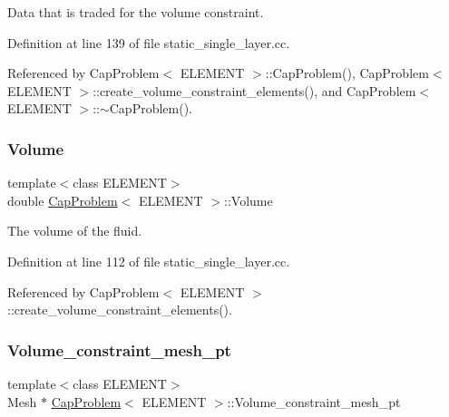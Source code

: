 Data that is traded for the volume constraint. 



Definition at line 139 of file static\+\_\+single\+\_\+layer.\+cc.



Referenced by Cap\+Problem$<$ E\+L\+E\+M\+E\+N\+T $>$\+::\+Cap\+Problem(), Cap\+Problem$<$ E\+L\+E\+M\+E\+N\+T $>$\+::create\+\_\+volume\+\_\+constraint\+\_\+elements(), and Cap\+Problem$<$ E\+L\+E\+M\+E\+N\+T $>$\+::$\sim$\+Cap\+Problem().

\mbox{\label{classCapProblem_ab1f403fd3be7648c3a52a66684a78f7e}} 
\subsubsection{\texorpdfstring{Volume}{Volume}}
{\footnotesize\ttfamily template$<$class E\+L\+E\+M\+E\+NT$>$ \\
double \hyperlink{classCapProblem}{Cap\+Problem}$<$ E\+L\+E\+M\+E\+NT $>$\+::Volume\hspace{0.3cm}{\ttfamily [private]}}



The volume of the fluid. 



Definition at line 112 of file static\+\_\+single\+\_\+layer.\+cc.



Referenced by Cap\+Problem$<$ E\+L\+E\+M\+E\+N\+T $>$\+::create\+\_\+volume\+\_\+constraint\+\_\+elements().

\mbox{\label{classCapProblem_a0a115f38ca8ff18937619dd918a38bb1}} 
\subsubsection{\texorpdfstring{Volume\+\_\+constraint\+\_\+mesh\+\_\+pt}{Volume\_constraint\_mesh\_pt}}
{\footnotesize\ttfamily template$<$class E\+L\+E\+M\+E\+NT$>$ \\
Mesh $\ast$ \hyperlink{classCapProblem}{Cap\+Problem}$<$ E\+L\+E\+M\+E\+NT $>$\+::Volume\+\_\+constraint\+\_\+mesh\+\_\+pt\hspace{0.3cm}{\ttfamily [private]}}



